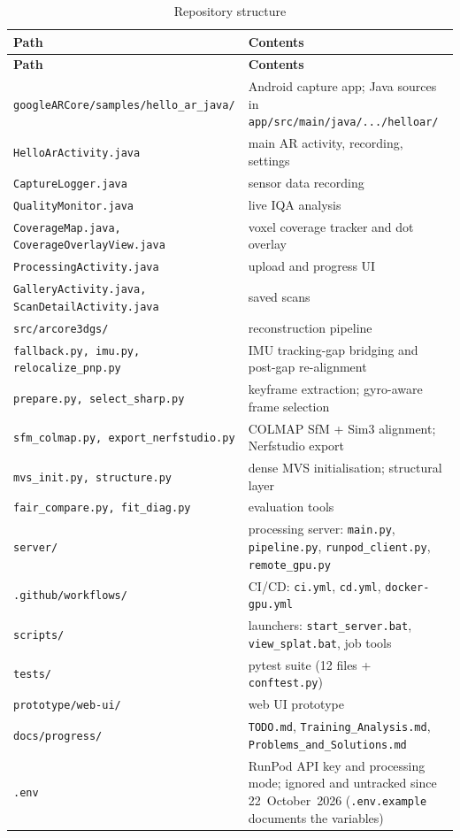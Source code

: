 {\footnotesize
\begin{longtable}{p{}p{}}
\caption{Repository structure}\label{tab:repo}\\
\toprule
\textbf{Path} & \textbf{Contents} \\
\midrule
\endfirsthead
\toprule
\textbf{Path} & \textbf{Contents} \\
\midrule
\endhead
\texttt{googleARCore/samples/}\allowbreak\texttt{hello\_ar\_java/} & Android capture app; Java sources in \texttt{app/src/main/java/.../helloar/} \\
\quad\texttt{HelloArActivity.java} & main AR activity, recording, settings \\
\quad\texttt{CaptureLogger.java} & sensor data recording \\
\quad\texttt{QualityMonitor.java} & live IQA analysis \\
\quad\texttt{CoverageMap.java, CoverageOverlayView.java} & voxel coverage tracker and dot overlay \\
\quad\texttt{ProcessingActivity.java} & upload and progress UI \\
\quad\texttt{GalleryActivity.java, ScanDetailActivity.java} & saved scans \\
\texttt{src/arcore3dgs/} & reconstruction pipeline \\
\quad\texttt{fallback.py, imu.py, relocalize\_pnp.py} & IMU tracking-gap bridging and post-gap re-alignment \\
\quad\texttt{prepare.py, select\_sharp.py} & keyframe extraction; gyro-aware frame selection \\
\quad\texttt{sfm\_colmap.py, export\_nerfstudio.py} & COLMAP SfM + Sim3 alignment; Nerfstudio export \\
\quad\texttt{mvs\_init.py, structure.py} & dense MVS initialisation; structural layer \\
\quad\texttt{fair\_compare.py, fit\_diag.py} & evaluation tools \\
\texttt{server/} & processing server: \texttt{main.py}, \texttt{pipeline.py}, \texttt{runpod\_client.py}, \texttt{remote\_gpu.py} \\
\texttt{.github/workflows/} & CI/CD: \texttt{ci.yml}, \texttt{cd.yml}, \texttt{docker-gpu.yml} \\
\texttt{scripts/} & launchers: \texttt{start\_server.bat}, \texttt{view\_splat.bat}, job tools \\
\texttt{tests/} & pytest suite (12 files + \texttt{conftest.py}) \\
\texttt{prototype/web-ui/} & web UI prototype \\
\texttt{docs/progress/} & \texttt{TODO.md}, \texttt{Training\_Analysis.md}, \texttt{Problems\_and\_Solutions.md} \\
\texttt{.env} & RunPod API key and processing mode; ignored and untracked since 22~October~2026 (\texttt{.env.example} documents the variables) \\
\bottomrule
\end{longtable}
}

